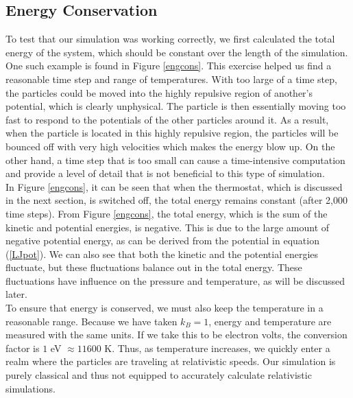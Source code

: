 \documentclass{article}
\begin{document}
\begin{multicols}{2}
\subsection{Energy Conservation}

To test that our simulation was working correctly, we first calculated the total energy of the system, which should be constant over the length of the simulation.  One such example is found in Figure \ref{engcons}.  This exercise helped us find a reasonable time step and range of temperatures.  With too large of a time step, the particles could be moved into the highly repulsive region of another's potential, which is clearly unphysical. The particle is then essentially moving too fast to respond to the potentials of the other particles around it. As a result, when the particle is located in this highly repulsive region, the particles will be bounced off with very high velocities which makes the energy blow up. On the other hand, a time step that is too small can cause a time-intensive computation and provide a level of detail that is not beneficial to this type of simulation. \\

In Figure \ref{engcons}, it can be seen that when the thermostat, which is discussed in the next section, is switched off, the total energy remains constant (after 2,000 time steps).  From Figure \ref{engcons}, the total energy, which is the sum of the kinetic and potential energies, is negative.  This is due to the large amount of negative potential energy, as can be derived from the potential in equation (\ref{LJpot}).   We can also see that both the kinetic and the potential energies fluctuate, but these fluctuations balance out in the total energy. These fluctuations have influence on the pressure and temperature, as will be discussed later.\\

To ensure that energy is conserved, we must also keep the temperature in a reasonable range.  Because we have taken $k_B =1$, energy and temperature are measured with the same units.  If we take this to be electron volts, the conversion factor is $1 $ eV $\approx 11600$ K.  Thus, as temperature increases, we quickly enter a realm where the particles are traveling at relativistic speeds.  Our simulation is purely classical and thus not equipped to accurately calculate relativistic simulations.


\end{multicols}
\end{document}
